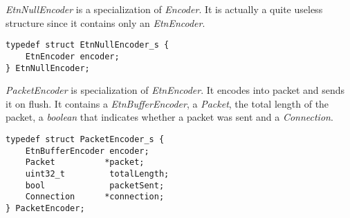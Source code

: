 \emph{EtnNullEncoder} is a specialization of \emph{Encoder}. It is actually a quite useless structure since it contains only an \emph{EtnEncoder}.
\begin{lstlisting}
typedef struct EtnNullEncoder_s {
	EtnEncoder encoder;
} EtnNullEncoder;
\end{lstlisting}
\emph{PacketEncoder} is specialization of \emph{EtnEncoder}. It encodes into packet and sends it on flush. It contains a \emph{EtnBufferEncoder}, a \emph{Packet}, the total length of the packet, a \emph{boolean} that indicates whether a packet was sent and a \emph{Connection}.
\begin{lstlisting}
typedef struct PacketEncoder_s {
	EtnBufferEncoder encoder;
	Packet          *packet;
	uint32_t         totalLength;
	bool             packetSent;
	Connection      *connection;
} PacketEncoder;
\end{lstlisting}